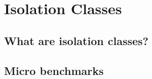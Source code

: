 \documentclass[../review.tex]{subfiles}
\begin{document}
\section{Isolation Classes}
\subsection{What are isolation classes?}
\subsection{Micro benchmarks}

\end{document}
